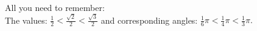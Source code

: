 \documentclass[preview]{standalone}
\begin{document}
\begin{center}
All you need to remember: \\ The values: $\frac{1}{2} < \frac{\sqrt{2}}{2} < \frac{\sqrt{3}}{2}$ and corresponding angles: $ \frac{1}{6} \pi < \frac{1}{4} \pi < \frac{1}{3} \pi. $
\end{center}
\end{document}
